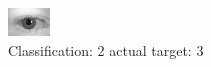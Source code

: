 \begin{figure}[h!]
\begin{center}
\includegraphics[width=0.60\columnwidth]{figures/ID515_class_2_target_3.png}
\end{center}
\caption{ Classification: 2 actual target: 3}
\label{fig:ID515_class_2_target_3}
\end{figure}
